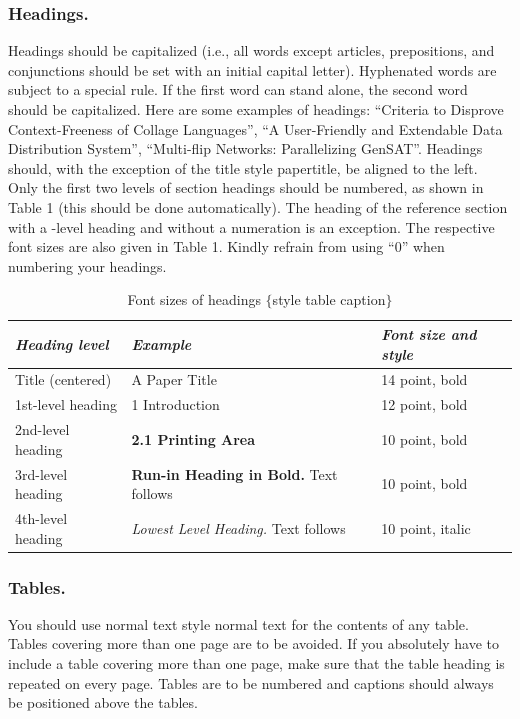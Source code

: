 \subsubsection{Headings.} 
Headings should be capitalized (i.e., all words except articles, prepositions, and conjunctions should be set with an initial capital letter). 
Hyphenated words are subject to a special rule. 
If the first word can stand alone, the second word should be capitalized. 
Here are some examples of headings: “Criteria to Disprove Context-Freeness of Collage Languages”, “A User-Friendly and Extendable Data Distribution System”, “Multi-flip Networks: Parallelizing GenSAT”. 
Headings should, with the exception of the title {style papertitle}, be aligned to the left. 
Only the first two levels of section headings should be numbered, as shown in Table 1 (this should be done automatically). 
The heading of the reference section with a -level heading and without a numeration is an exception. 
The respective font sizes are also given in Table 1. Kindly refrain from using “0” when numbering your headings.

\begin{table}[htb]
\centering
\caption{Font sizes of headings $\{$style table caption$\}$}
\label{tab:my-table}
\begin{tabular}{@{}lll@{}}
\toprule
\textit{Heading level} & \textit{Example} & \textit{Font size and style} \\ \midrule
Title (centered) & \Large{A Paper Title} & 14 point, bold \\
1st-level heading & \large{1 Introduction} & 12 point, bold \\
2nd-level heading & \textbf{2.1 Printing Area} & 10 point, bold \\
3rd-level heading & \textbf{Run-in Heading in Bold.} Text follows & 10 point, bold\\
4th-level heading & \textit{Lowest Level Heading.} Text follows & 10 point, italic \\ \bottomrule
\end{tabular}
\end{table}

\subsubsection{Tables.} 
You should use normal text {style normal text} for the contents of any table. 
Tables covering more than one page are to be avoided. 
If you absolutely have to include a table covering more than one page, make sure that the table heading is repeated on every page. 
Tables are to be numbered and captions should always be positioned above the tables.

